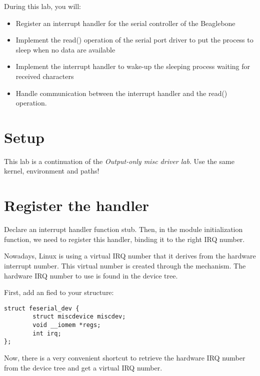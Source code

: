 
During this lab, you will:

\begin{itemize}
\item Register an interrupt handler for the serial controller of the
  Beaglebone
\item Implement the read() operation of the serial port driver to put
  the process to sleep when no data are available
\item Implement the interrupt handler to wake-up the sleeping process
  waiting for received characters
\item Handle communication between the interrupt handler and the
  read() operation.
\end{itemize}

\section{Setup}

This lab is a continuation of the {\em Output-only misc driver
lab}. Use the same kernel, environment and paths!

\section{Register the handler}

Declare an interrupt handler function stub. Then, in the module
initialization function, we need to register this handler, binding
it to the right IRQ number.

Nowadays, Linux is using a virtual IRQ number that it derives from the
hardware interrupt number. This virtual number is created through the
 mechanism. The hardware IRQ number to use is found in
the device tree.

First, add an  fied to your  structure:

\begin{verbatim}
struct feserial_dev {
        struct miscdevice miscdev;
        void __iomem *regs;
        int irq;
};
\end{verbatim}

Now, there is a very convenient shortcut to retrieve the
hardware IRQ number from the device tree and get a virtual IRQ number.

